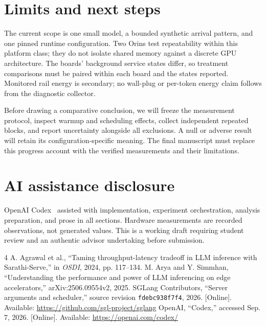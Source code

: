 \documentclass[conference,10pt,letterpaper]{IEEEtran}
\begin{document}
\section{Limits and next steps}
The current scope is one small model, a bounded synthetic arrival pattern, and one pinned runtime configuration. Two Orins test repeatability within this platform class; they do not isolate shared memory against a discrete GPU architecture. The boards' background service states differ, so treatment comparisons must be paired within each board and the states reported. Monitored rail energy is secondary; no wall-plug or per-token energy claim follows from the diagnostic collector.

Before drawing a comparative conclusion, we will freeze the measurement protocol, inspect warmup and scheduling effects, collect independent repeated blocks, and report uncertainty alongside all exclusions. A null or adverse result will retain its configuration-specific meaning. The final manuscript must replace this progress account with the verified measurements and their limitations.

\section*{AI assistance disclosure}
OpenAI Codex~\cite{codex} assisted with implementation, experiment orchestration, analysis preparation, and prose in all sections. Hardware measurements are recorded observations, not generated values. This is a working draft requiring student review and an authentic advisor undertaking before submission.

\begin{thebibliography}{4}
 A. Agrawal et al., ``Taming throughput-latency tradeoff in LLM inference with Sarathi-Serve,'' in \emph{OSDI}, 2024, pp. 117--134.
 M. Arya and Y. Simmhan, ``Understanding the performance and power of LLM inferencing on edge accelerators,'' arXiv:2506.09554v2, 2025.
 SGLang Contributors, ``Server arguments and scheduler,'' source revision \texttt{fdebc938f7f4}, 2026. [Online]. Available: \url{https://github.com/sgl-project/sglang}
 OpenAI, ``Codex,'' accessed Sep. 7, 2026. [Online]. Available: \url{https://openai.com/codex/}
\end{thebibliography}
\end{document}
